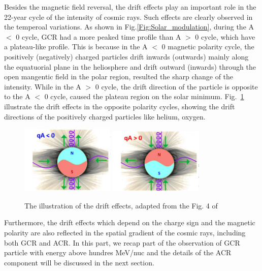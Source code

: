 Besides the magnetic field reversal, the drift effects play an important role in the 22-year cycle of the intensity of cosmic rays. Such effects are clearly observed in the temperoal variations.
As shown in Fig.\ref{Fig:Solar_modulation}, during the A $<$ 0 cycle, GCR had a more peaked time profile than A $>$ 0 cycle, which have a plateau-like profile. 
This is because in the A $<$ 0 magnetic polarity cycle, the positively (negatively) charged particles drift inwards (outwards) mainly along the equatuorial plane in the heliosphere and drift outward (inwards) through the open mangentic field in the polar region, resulted the sharp change of the intensity. While in the A $>$ 0 cycle, the drift direction of the particle is opposite to the A $<$ 0 cycle, caused the plateau region on the solar minimum. Fig.~\ref{Fig:drift_effect} illustrate the drift effects in the opposite polarity cycles, showing the drift directions of the positively charged particles like helium, oxygen.

\begin{figure}
	\centering
	\includegraphics[width = 0.4\textwidth]{images/drift_effect.png}
	\includegraphics[width = 0.4\textwidth]{images/drift_effect_2.png}
	\caption{The illustration of the drift effects, adapted from the Fig. 4 of \citep{Rankin2022ApJ}}
	\label{Fig:drift_effect}	
\end{figure}

Furthermore, the drift effects which depend on the charge sign and the magnetic polarity are also reflected in the spatial gradient of the cosmic rays, including both \ac{GCR} and \ac{ACR}. In this part, we recap part of the observation of \ac{GCR} particle with energy above hundres MeV/nuc and the details of the \ac{ACR} component will be discussed in the next section. 

